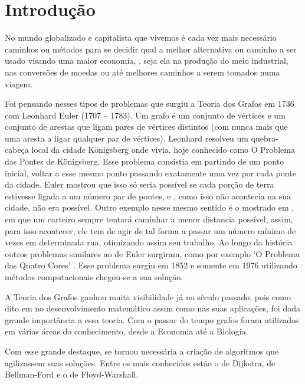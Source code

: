 \chapter*[Introdução]{Introdução}

No mundo globalizado e capitalista que vivemos é cada vez mais necessário caminhos ou métodos para se decidir qual a melhor alternativa ou caminho a ser usado visando uma maior economia, , seja ela na produção do meio industrial, nas conversões de moedas ou até melhores caminhos a serem tomados numa viagem. 

Foi pensando nesses tipos de problemas que surgiu a Teoria dos Grafos em 1736 com Leonhard Euler (1707 – 1783). Um grafo é um conjunto de vértices e um conjunto de arestas que ligam pares de vértices distintos (com nunca mais que uma aresta a ligar qualquer par de vértices).  Leonhard resolveu um quebra-cabeça local da cidade Königsberg onde vivia, hoje conhecido como O Problema das Pontes de Königsberg. Esse problema consistia em partindo de um ponto inicial, voltar a esse mesmo ponto passando exatamente uma vez por cada ponte da cidade. Euler mostrou que isso só seria possível se cada porção de terra estivesse ligada a um número par de pontes, e , como isso não acontecia na sua cidade, não era possível.  Outro exemplo nesse mesmo sentido é o mostrado em \cite{costalonga2012grafos}, em que um carteiro sempre tentará caminhar a menor distancia possível, assim, para isso acontecer, ele tem de agir de tal forma a passar um número mínimo de vezes em determinada rua, otimizando assim seu trabalho. Ao longo da história outros problemas similares ao de Euler surgiram, como por exemplo ‘O Problema das Quatro Cores’ . Esse problema surgiu em 1852 e somente em 1976 utilizando métodos computacionais chegou-se a sua solução. 

A Teoria dos Grafos ganhou muita visibilidade já no século passado, pois como dito em \cite{ da2011teoria} no desenvolvimento matemático  assim como nas suas aplicações, foi dada grande importância a essa teoria. Com o passar do tempo grafos foram utilizados em várias áreas do conhecimento, desde a Economia até a Biologia. 

Com esse grande destaque, se tornou necessária a criação de algoritmos que agilizassem suas soluções. Entre os mais conhecidos estão o de Dijkstra, de Bellman-Ford e o de Floyd-Warshall.
